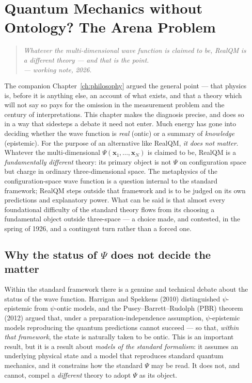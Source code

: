 \chapter{Quantum Mechanics without Ontology? The Arena Problem}\label{ch:ontology}

\begin{quote}
\itshape Whatever the multi-dimensional wave function is claimed to be, RealQM is a different theory --- and that
is the point.\\
\normalfont\hfill --- working note, 2026.
\end{quote}
\bigskip

The companion Chapter~\ref{ch:philosophy} argued the general point --- that physics is, before it is anything
else, an account of what exists, and that a theory which will not say so pays for the omission in the measurement
problem and the century of interpretations. This chapter makes the diagnosis precise, and does so in a way
that sidesteps a debate it need not enter. Much energy has gone into deciding whether the wave function is
\emph{real} (ontic) or a summary of \emph{knowledge} (epistemic). For the purpose of an alternative like RealQM,
\emph{it does not matter}. Whatever the multi-dimensional $\Psi(\mathbf x_1,\dots,\mathbf x_N)$ is claimed to be,
RealQM is a \emph{fundamentally different} theory: its primary object is not $\Psi$ on configuration space but
charge in ordinary three-dimensional space. The metaphysics of the configuration-space wave function is a
question internal to the standard framework; RealQM steps outside that framework and is to be judged on its own
predictions and explanatory power. What can be said is that almost every foundational difficulty of the standard
theory flows from its choosing a fundamental object outside three-space --- a choice made, and contested, in the
spring of 1926, and a contingent turn rather than a forced one.

\section{Why the status of $\Psi$ does not decide the matter}\label{sec:onto-pbr}

Within the standard framework there is a genuine and technical debate about the status of the wave function.
Harrigan and Spekkens (2010) distinguished $\psi$-epistemic from $\psi$-ontic models, and the
Pusey--Barrett--Rudolph (PBR) theorem (2012) argued that, under a preparation-independence assumption,
$\psi$-epistemic models reproducing the quantum predictions cannot succeed --- so that, \emph{within that
framework}, the state is naturally taken to be ontic. This is an important result, but it is a result about
\emph{models of the standard formalism}: it assumes an underlying physical state and a model that reproduces
standard quantum mechanics, and it constrains how the standard $\Psi$ may be read. It does not, and cannot, compel
a \emph{different} theory to adopt $\Psi$ as its object.

